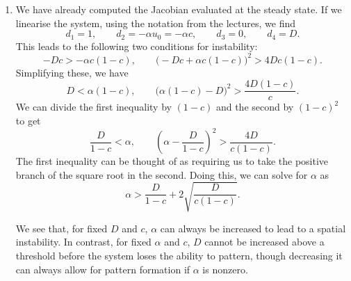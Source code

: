 \documentclass[a4paper,12pt]{article}
\begin{document}
\begin{enumerate}
{\begin{enumerate}[label=(\alph*)]
            \item
            We have already computed the Jacobian evaluated at the
            steady state. If we linearise the system, using the notation
            from the lectures, we find
            \[
                d_1=1,
                \qquad
                d_2=-\alpha u_0=-\alpha c,
                \qquad
                d_3=0,
                \qquad
                d_4=D.
            \]
            This leads to the following two conditions for instability:
            \[
                -Dc>-\alpha c(1-c),
                \qquad
                \bigl(-Dc+\alpha c(1-c)\bigr)^2
                >4Dc(1-c).
            \]
            Simplifying these, we have
            \[
                D<\alpha(1-c),
                \qquad
                \bigl(\alpha(1-c)-D\bigr)^2
                >\frac{4D(1-c)}{c}.
            \]
            We can divide the first inequality by $(1-c)$ and the
            second by $(1-c)^2$ to get
            \[
                \frac{D}{1-c}<\alpha,
                \qquad
                \left(\alpha-\frac{D}{1-c}\right)^2
                >\frac{4D}{c(1-c)}.
            \]
            The first inequality can be thought of as requiring us to
            take the positive branch of the square root in the second.
            Doing this, we can solve for $\alpha$ as
            \[
                \alpha>
                \frac{D}{1-c}
                +2\sqrt{\frac{D}{c(1-c)}}.
            \]

            We see that, for fixed $D$ and $c$, $\alpha$ can always be
            increased to lead to a spatial instability. In contrast,
            for fixed $\alpha$ and $c$, $D$ cannot be increased above a
            threshold before the system loses the ability to pattern,
            though decreasing it can always allow for pattern formation
            if $\alpha$ is nonzero.


        \end{enumerate}
    }

\end{enumerate}
\end{document}

